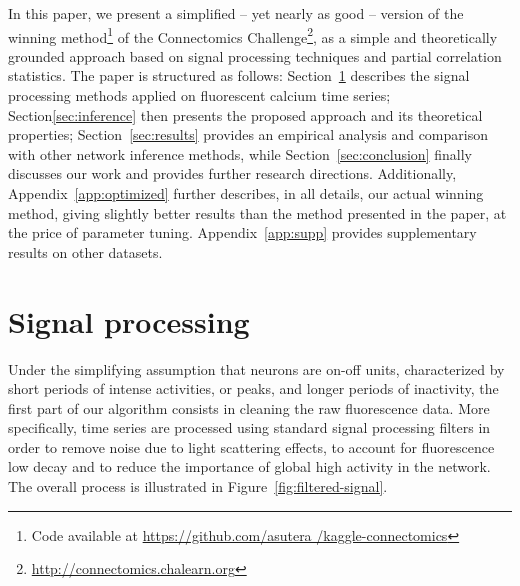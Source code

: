 \documentclass[wcp]{jmlr}
\begin{document}
In this paper, we present a simplified -- yet nearly as good -- version of the
winning method\footnote{Code available at \url{https://github.com/asutera
/kaggle-connectomics}} of the Connectomics
Challenge\footnote{\url{http://connectomics.chalearn.org}}, as a simple and
theoretically grounded approach based on signal processing techniques and
partial correlation statistics. The paper is structured as follows:
Section~\ref{sec:filter} describes the signal processing methods applied on
fluorescent calcium time series; Section\ref{sec:inference} then presents the
proposed approach and its theoretical properties; Section~\ref{sec:results}
provides an empirical analysis and comparison with other network inference
methods, while Section~\ref{sec:conclusion} finally discusses our work and
provides further research directions. Additionally,
Appendix~\ref{app:optimized} further describes, in all details, our actual
winning method, giving slightly better results than the method presented in
the paper, at the price of parameter tuning. Appendix~\ref{app:supp} provides supplementary results on other datasets.


\section{Signal processing} \label{sec:filter}

Under the simplifying assumption that neurons are on-off units, characterized
by short periods of intense activities, or peaks, and longer periods of
inactivity, the first part of our algorithm consists in cleaning the raw
fluorescence data. More specifically, time series are processed using standard
signal processing filters in order to remove noise due to light scattering
effects, to account for fluorescence  low decay and to reduce the importance of
global high activity in the network. The overall process is illustrated in
Figure~\ref{fig:filtered-signal}.
\end{document}
